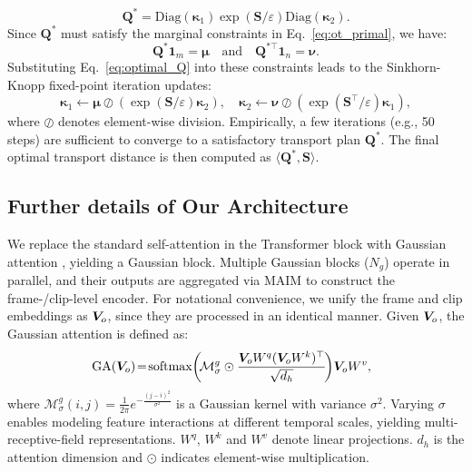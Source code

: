 \begin{equation}
    \mathbf{Q}^* = \text{Diag}(\boldsymbol{\kappa}_1) \exp(\mathbf{S}/\varepsilon) \text{Diag}(\boldsymbol{\kappa}_2).
    \label{eq:optimal_Q}
\end{equation}
Since $\mathbf{Q}^*$ must satisfy the marginal constraints in Eq.~\eqref{eq:ot_primal}, we have:
\begin{equation}
    \mathbf{Q}^*\mathbf{1}_m = \boldsymbol{\mu} \quad \text{and} \quad \mathbf{Q}^{*\top}\mathbf{1}_n = \boldsymbol{\nu}.
\end{equation}
Substituting Eq.~\eqref{eq:optimal_Q} into these constraints leads to the Sinkhorn-Knopp fixed-point iteration updates:
\begin{equation}
    \boldsymbol{\kappa}_1 \leftarrow \boldsymbol{\mu} \oslash (\exp(\mathbf{S}/\varepsilon) \boldsymbol{\kappa}_2), \quad 
    \boldsymbol{\kappa}_2 \leftarrow \boldsymbol{\nu} \oslash (\exp(\mathbf{S}^\top/\varepsilon) \boldsymbol{\kappa}_1),
\end{equation}
where $\oslash$ denotes element-wise division. Empirically, a few iterations (e.g., 50 steps) are sufficient to converge to a satisfactory transport plan $\mathbf{Q}^*$. The final optimal transport distance is then computed as $\langle \mathbf{Q}^*, \mathbf{S} \rangle$.
\subsection{Further details of Our Architecture}
We replace the standard self-attention in the Transformer block with Gaussian attention \cite{GMMFORMER}, yielding a Gaussian block.
Multiple Gaussian blocks ($N_g$) operate in parallel, and their outputs are aggregated via MAIM \cite{HLFormer} to construct the frame-/clip-level encoder.
For notational convenience, we unify the frame and clip embeddings as $\bm{V}_o$, since they are processed in an identical manner.
Given $\bm{V}_o$, the Gaussian attention is defined as:
\vspace{-.6em}
\begin{equation}\label{eq:euclidean-attention}
  \!\! \!\! \text{GA}({\bmV_o})\! =\!\text{softmax}\!\left(\!\mathcal{M}_{\sigma}^{g} \odot \frac{ {\bmV_o} W^q ( {\bmV_o} W^k)^{\top}}{\sqrt{d_h}}\!\right)\!{\bmV_o} W^v,
\vspace{-.6em}
\end{equation}
where $\displaystyle\mathcal{M}_{\sigma}^{g}(i, j) = \frac{1}{2\pi} e^{-\frac{(j-i)^2}{\sigma^2}}$ is a Gaussian kernel with variance $\sigma^2$. Varying $\sigma$ enables modeling feature interactions at different temporal scales, yielding multi-receptive-field representations. $W^q$, $W^k$ and $W^v$ denote linear projections. $d_h$ is the attention dimension and $\odot$ indicates element-wise multiplication.
